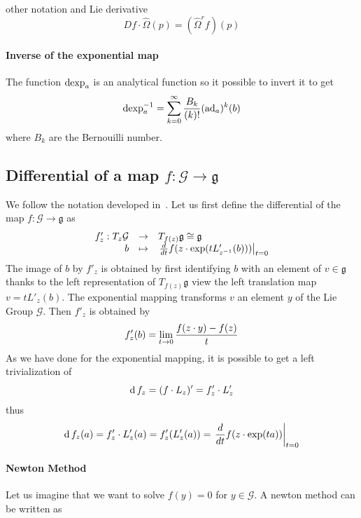 \begin{ndrva}
  other notation and Lie derivative
  \begin{equation}
    \label{eq:178}
      Df \cdot \widehat \Omega (p) = (\widehat \Omega^r f )(p)
  \end{equation}
\end{ndrva}



\paragraph{Inverse of the exponential map}


The function $\operatorname{dexp}_{a}$ is an analytical function so it possible to invert it to get
\begin{equation}
  \label{eq:45}
  \operatorname{dexp}^{-1}_{a} = \sum_{k=0}^\infty \frac{B_k}{(k)!} (\operatorname{ad}_a)^k(b)
\end{equation}
where $B_k$ are the Bernouilli number.

\subsection{Differential of a map $f : \mathcal G \rightarrow \mathfrak g$}

We follow the notation developed in~\cite{Owren.Welfert_BIT2000}. Let us first define the differential of the map $f : \mathcal G \rightarrow \mathfrak g$ as
\begin{equation}
  \label{eq:166}
  \begin{array}[rcl]{rcl}
    f'_z : T_z\mathcal G &\rightarrow&T_{f(z)}\mathfrak g \cong  \mathfrak g\\
    b &\mapsto& \left.\frac{d}{dt} f(z\glaw \exp(t L'_{z^{-1}}(b))) \right|_{t=0}
  \end{array}
\end{equation}
The image of $b$ by $f'_z$   is obtained by first identifying $b$ with an element of $v \in \mathfrak g$ thanks to the left representation of $T_{f(z)}\mathfrak g$ view the left translation map $v= t L'_z(b)$. The exponential mapping transforms $v$ an element $y$ of the Lie Group $\mathcal G$. Then $f'_z$ is obtained by
\begin{equation}
  \label{eq:167}
  f'_z(b) = \lim_{t\rightarrow 0} \frac{f(z\cdot y) - f(z)}{t}
\end{equation}
As we have done for the exponential mapping, it is possible to get a left trivialization of
\begin{equation}
  \label{eq:169}
  \operatorname{d} f_z = (f\cdot L_z)' = f'_z \cdot L'_z
\end{equation}
thus
\begin{equation}
  \label{eq:170}
  \operatorname{d} f_z (a) =  f'_z \cdot L'_z(a) = f'_z(L'_z(a)) =  \left.\frac{d}{dt} f(z\cdot \exp(t a )) \right|_{t=0}
\end{equation}

\paragraph{Newton Method}
Let us imagine that we want to solve $f(y) = 0 $ for $y \in \mathcal G$. A newton method can be written as
